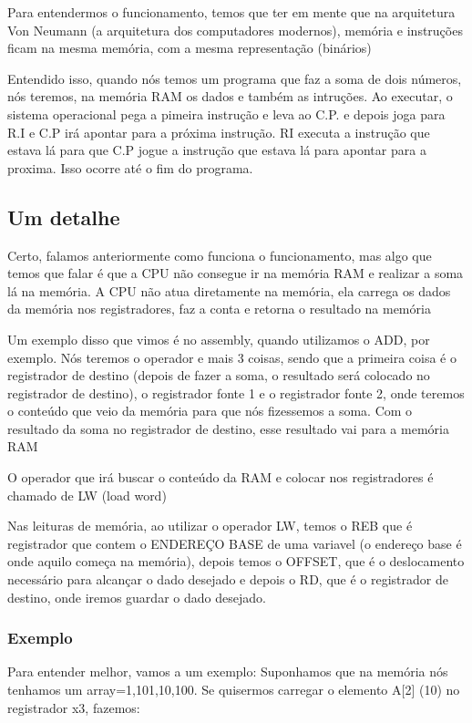 \documentclass[12pt,a4paper]{report}
\begin{document}
	Para entendermos o funcionamento, temos que ter em mente que na arquitetura Von Neumann (a arquitetura dos computadores modernos), memória e instruções ficam na mesma memória, com a mesma representação (binários)
	
	Entendido isso, quando nós temos um programa que faz a soma de dois números, nós teremos, na memória RAM os dados e também as intruções. Ao executar, o sistema operacional pega a pimeira instrução e leva ao C.P. e depois joga para R.I e C.P irá apontar para a próxima instrução. RI executa a instrução que estava lá para que C.P jogue a instrução que estava lá para apontar para a proxima. Isso ocorre até o fim do programa.
	
	\subsection{Um detalhe}
	
	Certo, falamos anteriormente como funciona o funcionamento, mas algo que temos que falar é que a CPU não consegue ir na memória RAM e realizar a soma lá na memória. A CPU não atua diretamente na memória, ela carrega os dados da memória nos registradores, faz a conta e retorna o resultado na memória
	
	Um exemplo disso que vimos é no assembly, quando utilizamos o ADD, por exemplo. Nós teremos o operador e mais 3 coisas, sendo que a primeira coisa é o registrador de destino (depois de fazer a soma, o resultado será colocado no registrador de destino), o registrador fonte 1 e o registrador fonte 2, onde teremos o conteúdo que veio da memória para que nós fizessemos a soma. Com o resultado da soma no registrador de destino, esse resultado vai para a memória RAM
	
	
	O operador que irá buscar o conteúdo da RAM e colocar nos registradores é chamado de LW (load word)
	
	Nas leituras de memória, ao utilizar o operador LW, temos o REB que é registrador que contem o ENDEREÇO BASE de uma variavel (o endereço base é onde aquilo começa na memória), depois temos o OFFSET, que é o deslocamento necessário para alcançar o dado desejado e depois o RD, que é o registrador de destino, onde iremos guardar o dado desejado.
	
	\subsubsection{Exemplo}
	Para entender melhor, vamos a um exemplo: Suponhamos que na memória nós tenhamos um array={1,101,10,100}. Se quisermos carregar o elemento A[2] (10) no registrador x3, fazemos:
	
\end{document}
